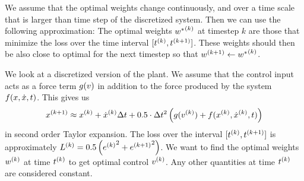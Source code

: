 \documentclass{article}
\begin{document}
    We assume that the optimal weights change continuously, and over a time scale that is 
    larger than time step of the discretized system. Then we can use the following approximation: The optimal weights 
    ${w^*}^{(k)}$ at timestep $k$ are those that minimize the loss over the time interval $[{t}^{(k)}, {t}^{(k+1)}]$. 
    These weights should then be also close to optimal for the next timestep so that 
    ${w}^{(k+1)} \leftarrow {w^*}^{(k)}$.

    We look at a discretized version of the plant. 
    We assume that the control input acts as a force term $g(v)$ in addition to the force produced 
    by the system $f(x, \dot{x}, t)$. This gives us 
    \begin{align}
        {x}^{(k+1)} \approx {x}^{(k)} + {\dot{x}}^{(k)} \Delta t + 0.5 \cdot \Delta t^2 \left( g({v}^{(k)}) + f({x}^{(k)}, {\dot{x}}^{(k)}, t) \right)
    \end{align}
    in second order Taylor expansion. The loss over the interval $[{t}^{(k)}, {t}^{(k+1)}]$ is approximately
    ${L}^{(k)} = 0.5 \left( {{e}^{(k)}}^2 + {{e}^{(k+1)}}^2 \right)$. 
    We want to find the optimal weights ${w}^{(k)}$ at time ${t}^{(k)}$ to get optimal control ${v}^{(k)}$. 
    Any other quantities at time ${t}^{(k)}$ are considered constant.
\end{document}

